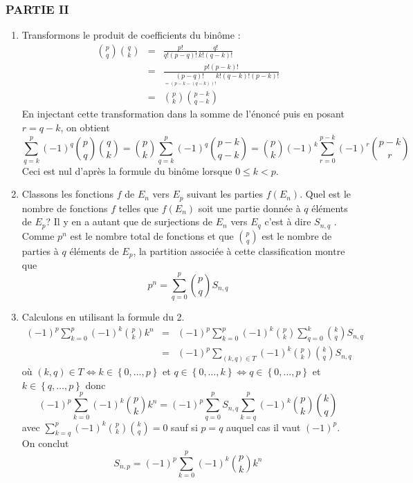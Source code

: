 \subsubsection*{PARTIE II}

\begin{enumerate}
\item  Transformons le produit de coefficients du bin{\^o}me :
\begin{eqnarray*}
\binom{p}{q}\binom{q}{k}&=&\frac{p!}{q!(p-q)!}\frac{q!}{k!(q-k)!}\\
&=&\frac{p!(p-k)!}{\underset{=(p-k-(q-k))!}{(p-q)!}k!(q-k)!(p-k)!}\\
&=&\binom{p}{k}%
\binom{p-k}{q-k}
\end{eqnarray*}
En injectant cette transformation dans la somme de l'{\'e}nonc{\'e} puis
en posant $r=q-k$, on obtient
\[
\sum_{q=k}^{p}(-1)^{q}\binom{p}{q}\binom{q}{k}=\binom{p}{k}%
\sum_{q=k}^{p}(-1)^{q}\binom{p-k}{q-k}=\binom{p}{k}(-1)^{k}%
\sum_{r=0}^{p-k}(-1)^{r}\binom{p-k}{r}
\]
Ceci est nul d'apr{\`e}s la formule du bin{\^o}me lorsque $0\leq k<p$.

\item  Classons les fonctions $f$ de $E_{n}$ vers $E_{p}$ suivant les
parties $f(E_{n})$. Quel est le nombre de fonctions $f$ telles que
$f(E_{n})$ soit une partie donn{\'e}e {\`a} $q$ {\'e}l{\'e}ments de $E_{p}$? Il y
en a
autant que de surjections de $E_{n}$ vers $E_{q}$ c'est {\`a} dire $S_{n,q}$%
. Comme $p^{n}$ est le nombre total de fonctions et que
$\binom{p}{q}$ est le nombre de parties {\`a} $q$ {\'e}l{\'e}ments de $E_{p}$,
la partition associ{\'e}e {\`a} cette classification montre que
\[
p^{n}=\sum_{q=0}^{p}\binom{p}{q}S_{n,q}
\]

\item  Calculons en utilisant la formule du 2.
\begin{eqnarray*}
(-1)^{p}\sum_{k=0}^{p}(-1)^{k}\binom{p}{k}k^{n}
&=&(-1)^{p}\sum_{k=0}^{p}(-1)^{k}\binom{p}{k}\sum_{q=0}^{k}\binom{k}{q}S_{n,q}\\
&=&(-1)^{p}\sum_{(k,q)\in
T}(-1)^{k}\binom{p}{k}\binom{k}{q}S_{n,q}
\end{eqnarray*}
o{\`u} $(k,q)\in T\Leftrightarrow k\in \left\{ 0,\ldots ,p\right\} $ et $%
q\in \left\{ 0,\ldots ,k\right\} \Leftrightarrow q\in \left\{
0,\ldots ,p\right\} $ et $k\in \left\{ q,\ldots ,p\right\} $ donc
\[
(-1)^{p}\sum_{k=0}^{p}(-1)^{k}\binom{p}{k}k^{n}=(-1)^{p}%
\sum_{q=0}^{p}S_{n,q}\sum_{k=q}^{p}(-1)^{k}\binom{p}{k}\binom{k}{q}
\]
avec $\sum_{k=q}^{p}(-1)^{k}\binom{p}{k}\binom{k}{q}=0$ sauf si
$p=q$ auquel cas il vaut $(-1)^{p}.$ On conclut
\[
S_{n,p}=(-1)^{p}\sum_{k=0}^{p}(-1)^{k}\binom{p}{k}k^{n}
\]


\end{enumerate}
